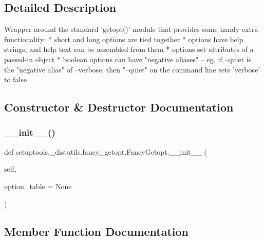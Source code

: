 \subsection{Detailed Description}
\begin{DoxyVerb}Wrapper around the standard 'getopt()' module that provides some
handy extra functionality:
  * short and long options are tied together
  * options have help strings, and help text can be assembled
    from them
  * options set attributes of a passed-in object
  * boolean options can have "negative aliases" -- eg. if
    --quiet is the "negative alias" of --verbose, then "--quiet"
    on the command line sets 'verbose' to false
\end{DoxyVerb}
 

\subsection{Constructor \& Destructor Documentation}
\mbox{\label{classsetuptools_1_1__distutils_1_1fancy__getopt_1_1FancyGetopt_aff40839af86cf0e7fe54e1c28898233a}} 
\subsubsection{\texorpdfstring{\+\_\+\+\_\+init\+\_\+\+\_\+()}{\_\_init\_\_()}}
{\footnotesize\ttfamily def setuptools.\+\_\+distutils.\+fancy\+\_\+getopt.\+Fancy\+Getopt.\+\_\+\+\_\+init\+\_\+\+\_\+ (\begin{DoxyParamCaption}\item[{}]{self,  }\item[{}]{option\+\_\+table = {\ttfamily None} }\end{DoxyParamCaption})}



\subsection{Member Function Documentation}
\mbox{\label{classsetuptools_1_1__distutils_1_1fancy__getopt_1_1FancyGetopt_a182bd660e389c85cdf1aeea64f9a17d1}} 
